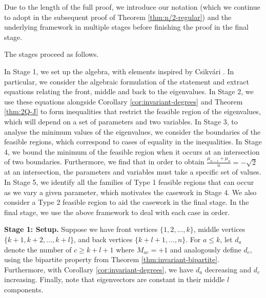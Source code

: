 \documentclass[11pt]{article}
\begin{document}
Due to the length of the full proof, we introduce our notation (which we continue to adopt in the subsequent proof of Theorem \ref{thm:n/2-regular}) and the underlying framework in multiple stages before finishing the proof in the final stage.

The stages proceed as follows. 
\begin{outline}[enumerate]
    \1 In Stage 1, we set up the algebra, with elements inspired by Csikv\'{a}ri \cite{csikvari2009conjecture}. In particular, we consider the algebraic formulation of the statement and extract equations relating the front, middle and back to the eigenvalues. 
    \1 In Stage 2, we use these equations alongside Corollary \ref{cor:invariant-degrees} and Theorem \ref{thm:2Q-J} to form inequalities that restrict the feasible region of the eigenvalues, which will depend on a set of parameters and two variables. 
    \1 In Stage 3, to analyse the minimum values of the eigenvalues, we consider the boundaries of the feasible regions, which correspond to cases of equality in the inequalities. 
    \1 In Stage 4, we bound the minimum of the feasible region when it occurs at an intersection of two boundaries. Furthermore, we find that in order to obtain $\frac{\mu_{n-1} + \mu_n}{n} = -\sqrt{2}$ at an intersection, the parameters and variables must take a specific set of values.
    \1 In Stage 5, we identify all the families of Type 1 feasible regions that can occur as we vary a given parameter, which motivates the casework in Stage 4. We also consider a Type 2 feasible region to aid the casework in the final stage. 
    \1 In the final stage, we use the above framework to deal with each case in order. \\
\end{outline}

\textbf{Stage 1: Setup.} Suppose we have front vertices $\{1, 2, \dots, k\}$, middle vertices $\{k+1, k+2, \dots, k+l\}$, and back vertices $\{k+l+1, \dots, n\}$. For $a \le k$, let $d_a$ denote the number of $c \ge k+l+1$ where $M_{ac} = +1$ and analogously define $d_c$, using the bipartite property from Theorem \ref{thm:invariant-bipartite}. Furthermore, with Corollary \ref{cor:invariant-degrees}, we have $d_a$ decreasing and $d_c$ increasing. Finally, note that eigenvectors are constant in their middle $l$ components. 
\end{document}
